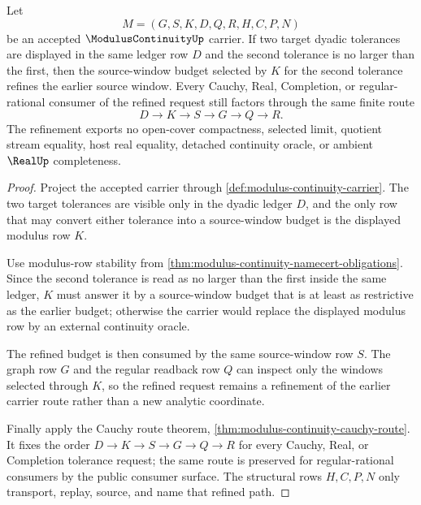 \begin{theorem}
\label{thm:modulus-continuity-window-monotonicity}
Let
$$
M=(G,S,K,D,Q,R,H,C,P,N)
$$
be an accepted $\ModulusContinuityUp$ carrier. If two target dyadic tolerances are displayed in the same ledger row $D$ and the second tolerance is no larger than the first, then the source-window budget selected by $K$ for the second tolerance refines the earlier source window. Every Cauchy, Real, Completion, or regular-rational consumer of the refined request still factors through the same finite route
$$
D \to K \to S \to G \to Q \to R .
$$
The refinement exports no open-cover compactness, selected limit, quotient stream equality, host real equality, detached continuity oracle, or ambient $\RealUp$ completeness.
\end{theorem}
\begin{proof}
Project the accepted carrier through \autoref{def:modulus-continuity-carrier}. The two target tolerances are visible only in the dyadic ledger $D$, and the only row that may convert either tolerance into a source-window budget is the displayed modulus row $K$.

Use modulus-row stability from \autoref{thm:modulus-continuity-namecert-obligations}. Since the second tolerance is read as no larger than the first inside the same ledger, $K$ must answer it by a source-window budget that is at least as restrictive as the earlier budget; otherwise the carrier would replace the displayed modulus row by an external continuity oracle.

The refined budget is then consumed by the same source-window row $S$. The graph row $G$ and the regular readback row $Q$ can inspect only the windows selected through $K$, so the refined request remains a refinement of the earlier carrier route rather than a new analytic coordinate.

Finally apply the Cauchy route theorem, \autoref{thm:modulus-continuity-cauchy-route}. It fixes the order $D \to K \to S \to G \to Q \to R$ for every Cauchy, Real, or Completion tolerance request; the same route is preserved for regular-rational consumers by the public consumer surface. The structural rows $H,C,P,N$ only transport, replay, source, and name that refined path.
\end{proof}

